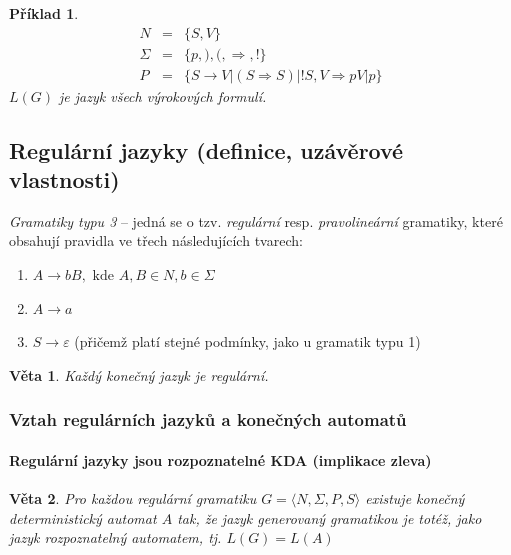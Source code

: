 \documentclass[10pt,a4paper]{article}
\theoremstyle{note}
\newtheorem{veta}{Věta}
\newtheorem{priklad}{Příklad}
\begin{document}
\begin{priklad}
\begin{eqnarray*}
N &=& \lbrace S, V \rbrace \\
\Sigma &=& \lbrace p,),(, \Rightarrow, ! \rbrace \\
P &=& \lbrace S \rightarrow V|(S \Rightarrow S)|!S, V \Rightarrow pV|p \rbrace
\end{eqnarray*}
$L(G)$ je jazyk všech výrokových formulí.
\end{priklad}


	\subsection{Regulární jazyky (definice, uzávěrové vlastnosti)}

		\textit{Gramatiky typu 3} -- jedná se o tzv. \textit{regulární} resp. \textit{pravolineární} gramatiky, které obsahují pravidla ve třech následujících tvarech:

\begin{enumerate}
\item
$A \rightarrow bB, \text{ kde } A,B \in N, b \in \Sigma$

\item
$A \rightarrow a$

\item
$S \rightarrow \varepsilon$ (přičemž platí stejné podmínky, jako u gramatik typu 1)
\end{enumerate}


\begin{veta}
Každý konečný jazyk je regulární.
\end{veta}

\subsubsection{Vztah regulárních jazyků a konečných automatů}

\paragraph{Regulární jazyky jsou rozpoznatelné KDA (implikace zleva)}

\begin{veta}
Pro každou regulární gramatiku $G=\langle N,\Sigma,P,S \rangle$ existuje konečný deterministický automat $A$ tak, že jazyk generovaný gramatikou je totéž, jako jazyk rozpoznatelný automatem, tj. $L(G)=L(A)$
\end{veta} 
\end{document}
